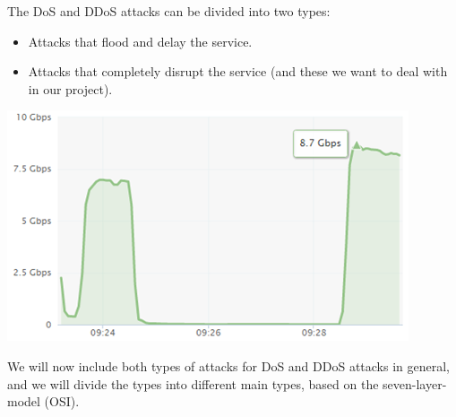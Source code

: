 \documentclass{article}
\begin{document}
\hfill \break The DoS and DDoS attacks can be divided into two types: 
\begin{itemize}
\item 	Attacks that flood and delay the service.
\item	Attacks that completely disrupt the service (and these we want to deal with in our project).

\end{itemize}
    \begin{center}
        \includegraphics{ddos-attack-traffic-gbps}
    \end{center}


 \hfill \break
 \hfill \break We will now include both types of attacks for DoS and DDoS attacks in general, and we will divide the types into different main types, based on the seven-layer-model (OSI).
\end{document}
